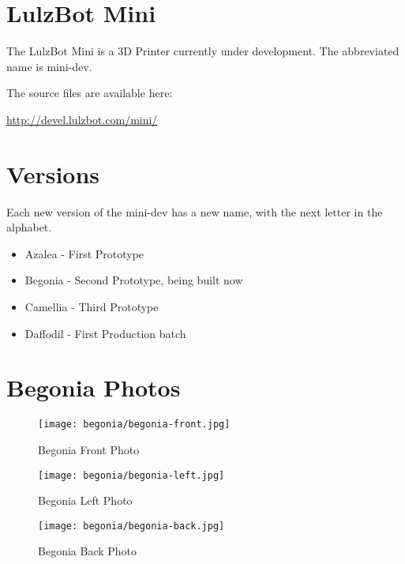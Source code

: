 %
%
%
%
%

\section{LulzBot Mini}
The LulzBot Mini is a 3D Printer currently under development. The
abbreviated name is mini-dev.

The source files are available here:

\href{http://devel.lulzbot.com/mini/}{http://devel.lulzbot.com/mini/}

\section{Versions}
Each new version of the mini-dev has a new name, with the next letter in the alphabet.

\begin{itemize}
  \item Azalea - First Prototype
  \item Begonia - Second Prototype, being built now
  \item Camellia - Third Prototype
  \item Daffodil - First Production batch
\end{itemize}

\section{Begonia Photos}

\begin{figure}[H]
\centering
\texttt{[image: begonia/begonia-front.jpg]}
\caption{Begonia Front Photo}
\label{fig:begfrontfoto}
\end{figure}

\begin{figure}[H]
\centering
\texttt{[image: begonia/begonia-left.jpg]}
\caption{Begonia Left Photo}
\label{fig:begleftfoto}
\end{figure}

\begin{figure}[H]
\centering
\texttt{[image: begonia/begonia-back.jpg]}
\caption{Begonia Back Photo}
\label{fig:begbackfoto}
\end{figure}

